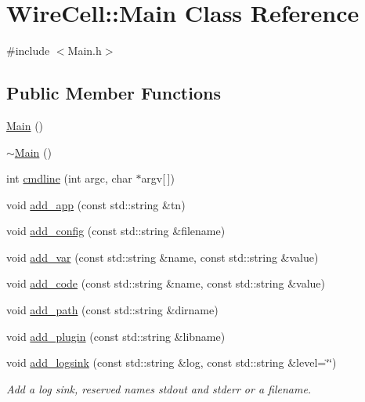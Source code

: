 \hypertarget{class_wire_cell_1_1_main}{}\section{Wire\+Cell\+:\+:Main Class Reference}
\label{class_wire_cell_1_1_main}


{\ttfamily \#include $<$Main.\+h$>$}

\subsection*{Public Member Functions}
\begin{DoxyCompactItemize}
\item 
\hyperlink{class_wire_cell_1_1_main_a50d4361a1b613205467a441b5c40c199}{Main} ()
\item 
\hyperlink{class_wire_cell_1_1_main_a58d9c0798f0d2114e736d04d780a080f}{$\sim$\+Main} ()
\item 
int \hyperlink{class_wire_cell_1_1_main_a6d6b47f6893cc6474d71d70bf5f8adcb}{cmdline} (int argc, char $\ast$argv\mbox{[}$\,$\mbox{]})
\item 
void \hyperlink{class_wire_cell_1_1_main_af256b8bb1a2af9cdd7a96468db4c929d}{add\+\_\+app} (const std\+::string \&tn)
\item 
void \hyperlink{class_wire_cell_1_1_main_a9c790104cfb1a5223d041dd10187d2e2}{add\+\_\+config} (const std\+::string \&filename)
\item 
void \hyperlink{class_wire_cell_1_1_main_a6c37e436a63876d242172070198e3192}{add\+\_\+var} (const std\+::string \&name, const std\+::string \&value)
\item 
void \hyperlink{class_wire_cell_1_1_main_aed27a7aa4fcf7fc4bb03637bc226f318}{add\+\_\+code} (const std\+::string \&name, const std\+::string \&value)
\item 
void \hyperlink{class_wire_cell_1_1_main_a5747c7dd28185179cb961b37d1b55a48}{add\+\_\+path} (const std\+::string \&dirname)
\item 
void \hyperlink{class_wire_cell_1_1_main_a198d57d515d756dc488dbc6ad5b14ccb}{add\+\_\+plugin} (const std\+::string \&libname)
\item 
void \hyperlink{class_wire_cell_1_1_main_a50af5cb3b3f2cfb176febecd4a1613ce}{add\+\_\+logsink} (const std\+::string \&log, const std\+::string \&level=\char`\"{}\char`\"{})
\begin{DoxyCompactList}\small\item\em Add a log sink, reserved names \textquotesingle{}stdout\textquotesingle{} and \textquotesingle{}stderr\textquotesingle{} or a filename. \end{DoxyCompactList}\item 

\end{DoxyCompactItemize}
